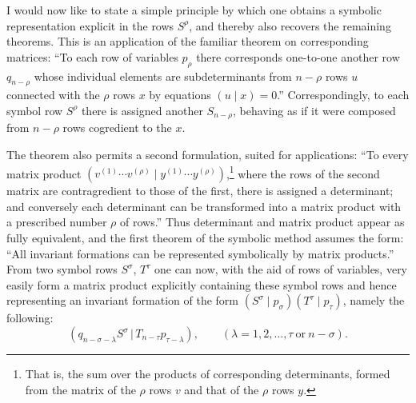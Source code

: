 \documentclass[11pt]{article}
\providecommand{\pair}[2]{(#1\,|\,#2)}
\begin{document}
I would now like to state a simple principle by which one obtains a symbolic representation explicit in the rows $S^\rho$, and thereby also recovers the remaining theorems. This is an application of the familiar theorem on corresponding matrices: ``To each row of variables $p_\rho$ there corresponds one-to-one another row $q_{n-\rho}$ whose individual elements are subdeterminants from $n-\rho$ rows $u$ connected with the $\rho$ rows $x$ by equations $(u\mid x)=0$.'' Correspondingly, to each symbol row $S^\rho$ there is assigned another $S_{n-\rho}$, behaving as if it were composed from $n-\rho$ rows cogredient to the $x$.

The theorem also permits a second formulation, suited for applications: ``To every matrix product $(v^{(1)}\cdots v^{(\rho)}\mid y^{(1)}\cdots y^{(\rho)})$,\footnote{That is, the sum over the products of corresponding determinants, formed from the matrix of the $\rho$ rows $v$ and that of the $\rho$ rows $y$.} where the rows of the second matrix are contragredient to those of the first, there is assigned a determinant; and conversely each determinant can be transformed into a matrix product with a prescribed number $\rho$ of rows.'' Thus determinant and matrix product appear as fully equivalent, and the first theorem of the symbolic method assumes the form: ``All invariant formations can be represented symbolically by matrix products.'' From two symbol rows $S^\sigma$, $T^\tau$ one can now, with the aid of rows of variables, very easily form a matrix product explicitly containing these symbol rows and hence representing an invariant formation of the form $(S^\sigma\mid p_\sigma)(T^\tau\mid p_\tau)$, namely the following:
\begin{equation}
 \pair{q_{n-\sigma-\lambda}S^\sigma}{T_{n-\tau}p_{\tau-\lambda}},
 \qquad (\lambda=1,2,\ldots,\tau\ \text{or}\ n-\sigma).
\tag{1}
\end{equation}
\end{document}
